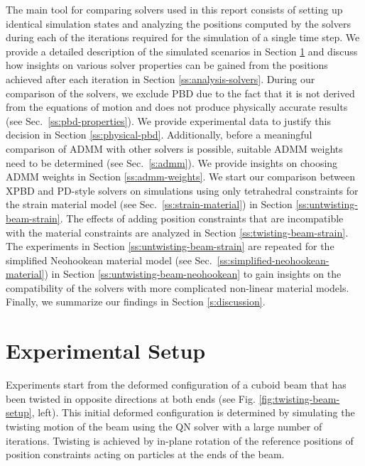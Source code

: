 The main tool for comparing solvers used in this report consists of setting up identical simulation states and analyzing the positions computed by the solvers during 
each of the iterations required for the simulation of a single time step. We provide a detailed description of the simulated scenarios in 
Section \ref{ss:experimental-setup} and discuss how insights on various solver properties can be gained from the positions achieved after each iteration in 
Section \ref{ss:analysis-solvers}. During our comparison of the solvers, we exclude PBD due to the fact that it is not derived from the equations of motion and does not produce 
physically accurate results (see Sec.\ \ref{ss:pbd-properties}). We provide experimental data to justify this decision in Section \ref{ss:physical-pbd}. Additionally, before a meaningful 
comparison of ADMM with other solvers is possible, suitable ADMM weights need to be determined (see Sec.\ \ref{s:admm}). We provide insights on choosing ADMM weights in Section \ref{ss:admm-weights}. 
We start our comparison between XPBD and PD-style solvers on simulations using only tetrahedral constraints for the strain material model (see Sec.\ \ref{ss:strain-material}) 
in Section \ref{ss:untwisting-beam-strain}. The effects of adding position constraints that are incompatible with the material constraints are analyzed in 
Section \ref{ss:twisting-beam-strain}. The experiments in Section \ref{ss:untwisting-beam-strain} are repeated for the simplified Neohookean material model (see 
Sec.\ \ref{ss:simplified-neohookean-material}) in Section \ref{ss:untwisting-beam-neohookean} to gain insights on the compatibility of the solvers with more complicated non-linear 
material models. Finally, we summarize our findings in Section \ref{s:discussion}.

\section{Experimental Setup}\label{ss:experimental-setup}
Experiments start from the deformed configuration of a cuboid beam that has been twisted in opposite directions at both ends (see Fig. \ref{fig:twisting-beam-setup}, left).
This initial deformed configuration is determined by simulating the twisting motion of the beam using the QN solver with a large number 
of iterations. Twisting is achieved by in-plane rotation of the reference positions 
of position constraints acting on particles at the ends of the beam. 

